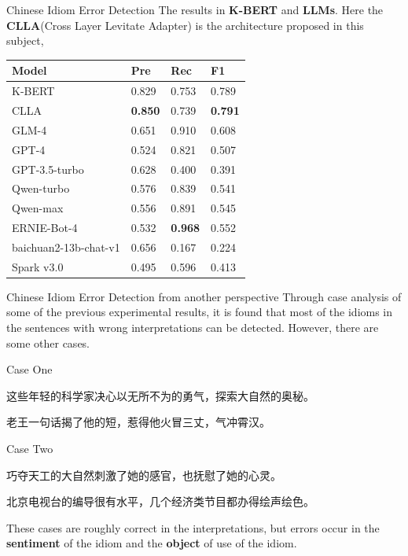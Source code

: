 \documentclass[10pt]{beamer}
\begin{document}
\begin{frame}{Chinese Idiom Error Detection}
The results in \textbf{K-BERT} and \textbf{LLMs}. Here the \textbf{CLLA}(Cross Layer Levitate Adapter) is the architecture proposed in this subject, 
\begin{table}[]
	\centering
	\begin{tabular}{llll}
		\toprule
		\textbf{Model}  & \textbf{Pre}  & \textbf{Rec}  & \textbf{F1}   \\ \midrule
		K-BERT & 0.829 & 0.753 & 0.789 \\
		CLLA   & \textbf{0.850} & 0.739 & \textbf{0.791} \\ \midrule
        GLM-4 & 0.651 & 0.910 & 0.608 \\
        GPT-4 & 0.524 & 0.821 & 0.507 \\
        GPT-3.5-turbo & 0.628 & 0.400 & 0.391 \\
        Qwen-turbo & 0.576 & 0.839 & 0.541 \\
        Qwen-max & 0.556 & 0.891 & 0.545 \\
        ERNIE-Bot-4 & 0.532 & \textbf{0.968} & 0.552 \\
        baichuan2-13b-chat-v1 & 0.656 & 0.167 & 0.224 \\
        Spark v3.0 & 0.495 & 0.596 & 0.413 \\ \midrule
	\end{tabular}
	\label{tab:my-table}
\end{table}

\end{frame}

\begin{frame}[fragile]{Chinese Idiom Error Detection from another perspective}
Through case analysis of some of the previous experimental results, it is found that most of the idioms in the sentences with wrong interpretations can be detected. However, there are some other cases.
\begin{alertblock}{Case One}
\begin{CJK}{UTF8}{gbsn}
这些年轻的科学家决心以无所不为的勇气，探索大自然的奥秘。

老王一句话揭了他的短，惹得他火冒三丈，气冲霄汉。
\end{CJK}
\end{alertblock}
\begin{alertblock}{Case Two}
\begin{CJK}{UTF8}{gbsn}
巧夺天工的大自然刺激了她的感官，也抚慰了她的心灵。

北京电视台的编导很有水平，几个经济类节目都办得绘声绘色。
\end{CJK}
\end{alertblock}
These cases are roughly correct in the interpretations, but errors occur in the \textbf{sentiment} of the idiom and the \textbf{object} of use of the idiom.
\end{frame}
\end{document}
